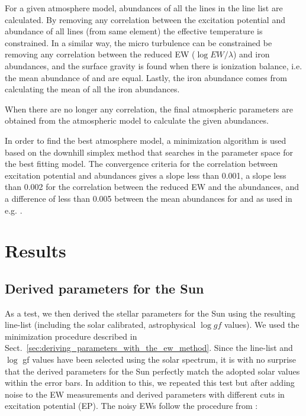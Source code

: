 \documentclass{aa}
\begin{document}
For a given atmosphere model, abundances of all the lines in the line
list are calculated. By removing any correlation between the excitation
potential and abundance of all lines (from same element) the effective
temperature is constrained. In a similar way, the micro turbulence
can be constrained be removing any correlation between the reduced
EW ($\log EW/\lambda$) and iron abundances, and the surface gravity is found when
there is ionization balance, i.e. the mean abundance of 
and  are equal. Lastly, the iron abundance comes from
calculating the mean of all the iron abundances.

When there are no longer any correlation, the final atmospheric
parameters are obtained from the atmospheric model to calculate the
given abundances.

In order to find the best atmosphere model, a minimization algorithm
is used based on the downhill simplex method \citep{Press1992} that
searches in the parameter space for the best fitting model. The
convergence criteria for the correlation between excitation potential
and abundances gives a slope less than 0.001, a slope less than
0.002 for the correlation between the reduced EW and the abundances,
and a difference of less than 0.005 between the mean abundances for
 and  as used in e.g. \citet{Tsantaki2013,Sousa2008a}.







\section{Results}
\label{sec:results}


\subsection{Derived parameters for the Sun}
\label{sec:derived_parameters_of_the_sun}

As a test, we then derived the stellar parameters for the Sun using
the resulting line-list (including the solar calibrated, astrophysical
$\log \mathit{gf}$ values). We used the minimization procedure described
in Sect.~\ref{sec:deriving_parameters_with_the_ew_method}. Since the
line-list and $\log$ gf values have been selected using the solar
spectrum, it is with no surprise that the derived parameters for the
Sun perfectly match the adopted solar values within the error bars. In addition
to this, we
repeated this test but after adding noise to the EW measurements and
derived parameters with different cuts in excitation potential (EP). The
noisy EWs follow the procedure from \cite{Caryel1988}:
\end{document}
